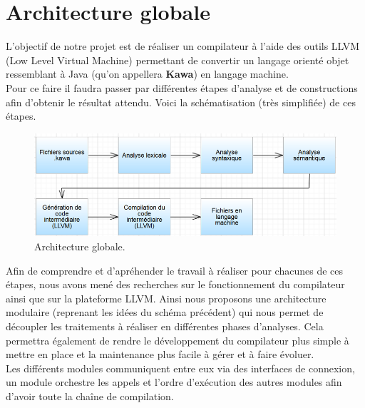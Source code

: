 \documentclass{../res/univ-projet}
\begin{document}
\maketitle
\newpage
\tableofcontents
\newpage



\section{Architecture globale}

L'objectif de notre projet est de réaliser un compilateur à l'aide des outils LLVM (Low Level Virtual Machine) permettant de convertir un langage orienté objet ressemblant à Java (qu'on appellera \textbf{Kawa}) en langage machine. \\

Pour ce faire il faudra passer par différentes étapes d'analyse et de constructions afin d'obtenir le résultat attendu. Voici la schématisation (très simplifiée) de ces étapes.\\

\begin{figure}[h!]
\centering
\includegraphics[scale=0.80]{archi1.png}
\caption[Schématisation de l'architectureArchitecture globale.]{Architecture globale.}
\end{figure}

Afin de comprendre et d'apréhender le travail à réaliser pour chacunes de ces étapes, nous avons mené des recherches sur le fonctionnement du compilateur ainsi que sur la plateforme LLVM. Ainsi nous proposons une architecture modulaire (reprenant les idées du schéma précédent) qui nous permet de découpler les traitements à réaliser en différentes phases d'analyses. Cela permettra également de rendre le développement du compilateur plus simple à mettre en place et la maintenance plus facile à gérer et à faire évoluer.\\

Les différents modules communiquent entre eux via des interfaces de connexion, un module orchestre les appels et l'ordre d’exécution des autres modules afin d'avoir toute la chaîne de compilation.\\
\end{document}
